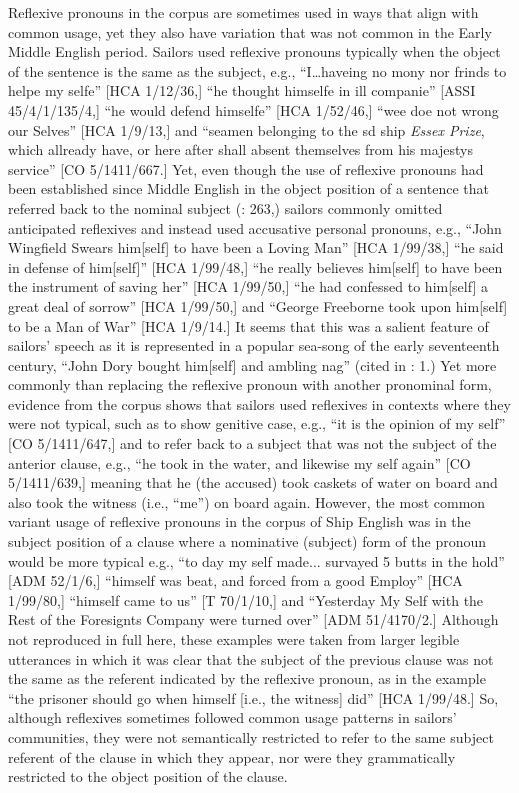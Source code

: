   Reflexive pronouns in the corpus are sometimes used in ways that align with common usage, yet they also have variation that was not common in the Early Middle English period. Sailors used reflexive pronouns typically when the object of the sentence is the same as the subject, e.g., “I…haveing no mony nor frinds to helpe my selfe” [HCA 1/12/36,] “he thought himselfe in ill companie” [ASSI 45/4/1/135/4,] “he would defend himselfe” [HCA 1/52/46,] “wee doe not wrong our Selves” [HCA 1/9/13,] and “seamen belonging to the sd ship \textit{Essex Prize}, which allready have, or here after shall absent themselves from his majestys service” [CO 5/1411/667.] Yet, even though the use of reflexive pronouns had been established since Middle English in the object position of a sentence that referred back to the nominal subject (\citealt{MillwardHayes2012}: 263,) sailors commonly omitted anticipated reflexives and instead used accusative personal pronouns, e.g., “John Wingfield Swears him[self] to have been a Loving Man” [HCA 1/99/38,] “he said in defense of him[self]” [HCA 1/99/48,] “he really believes him[self] to have been the instrument of saving her” [HCA 1/99/50,] “he had confessed to him[self] a great deal of sorrow” [HCA 1/99/50,] and “George Freeborne took upon him[self] to be a Man of War” [HCA 1/9/14.] It seems that this was a salient feature of sailors’ speech as it is represented in a popular sea-song of the early seventeenth century, “John Dory bought him[self] and ambling nag” (cited in \citealt{Palmer1986}: 1.) Yet more commonly than replacing the reflexive pronoun with another pronominal form, evidence from the corpus shows that sailors used reflexives in contexts where they were not typical, such as to show genitive case, e.g., “it is the opinion of my self” [CO 5/1411/647,] and to refer back to a subject that was not the subject of the anterior clause, e.g., “he took in the water, and likewise my self again” [CO 5/1411/639,] meaning that he (the accused) took caskets of water on board and also took the witness (i.e., “me”) on board again. However, the most common variant usage of reflexive pronouns in the corpus of Ship English was in the subject position of a clause where a nominative (subject) form of the pronoun would be more typical e.g., “to day my self made... survayed 5 butts in the hold” [ADM 52/1/6,] “himself was beat, and forced from a good Employ” [HCA 1/99/80,] “himself came to us” [T 70/1/10,] and “Yesterday My Self with the Rest of the Foresignts Company were turned over” [ADM 51/4170/2.] Although not reproduced in full here, these examples were taken from larger legible utterances in which it was clear that the subject of the previous clause was not the same as the referent indicated by the reflexive pronoun, as in the example “the prisoner should go when himself [i.e., the witness] did” [HCA 1/99/48.] So, although reflexives sometimes followed common usage patterns in sailors’ communities, they were not semantically restricted to refer to the same subject referent of the clause in which they appear, nor were they grammatically restricted to the object position of the clause. 

